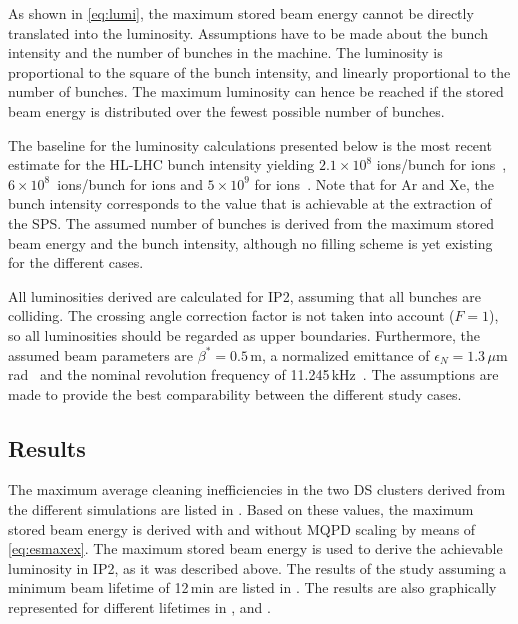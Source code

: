 As shown in \eqref{eq:lumi}, the maximum stored beam energy cannot be directly translated into the luminosity. Assumptions have to be made about the bunch intensity and the number of bunches in the machine. The luminosity is proportional to the square of the bunch intensity, and linearly proportional to the number of bunches. The maximum luminosity can hence be reached if the stored beam energy is distributed over the fewest possible number of bunches. 
\vspace{0.1cm}

The baseline for the luminosity calculations presented below is the most recent estimate for the HL-LHC bunch intensity yielding $2.1\times 10^8$ ions/bunch for \lead ions~\cite{jowett:private}, \mbox{$6\times 10^8$ ions/bunch} for  ions and $5 \times 10^9$ for   ions~\cite{IPAC16:TUPMR027}. Note that for Ar and Xe, the bunch intensity corresponds to the value that is achievable at the extraction of the SPS. The assumed number of bunches is derived from the maximum stored beam energy and the bunch intensity, although no filling scheme is yet existing for the different cases. 
\vspace{0.1cm}



All luminosities derived are calculated for IP2, assuming that all bunches are colliding. The crossing angle correction factor is not taken into account ($F=1$), so all luminosities should be regarded as upper boundaries. Furthermore, the assumed beam parameters are $\beta^* = 0.5\,$m, a normalized emittance of $\epsilon_N = 1.3\, \mu$m rad~\cite{jowett:private} and the nominal revolution frequency of 11.245\,kHz~\citedr.  The assumptions are made to provide the best comparability between the different study cases. 
%
\subsection{Results}
%
%
The maximum average cleaning inefficiencies in the two DS clusters derived from the different simulations are listed in . Based on these values, the maximum stored beam energy is derived with and without MQPD scaling by means of \eqref{eq:esmaxex}. The maximum stored beam energy is used to derive the achievable luminosity in IP2, as it was described above. The results of the study assuming a minimum beam lifetime of 12\,min are listed in . The results are also graphically represented for different lifetimes in ,  and  .

